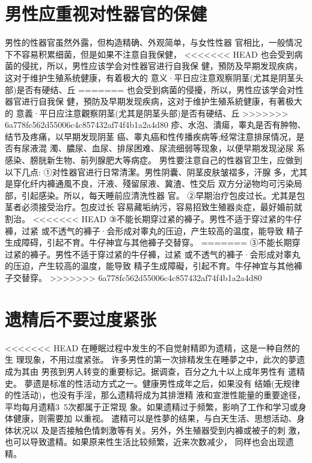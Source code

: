 \documentclass[12pt,UTF8]{ctexbook}
\begin{document}
\section{男性应重视对性器官的保健}

男性的性器官虽然外露，但构造精确、外观简单，与女性性器
官相比，一般情况下不容易积累细菌，但是如果不注意自我保健，
<<<<<<< HEAD
也会受到病菌的侵扰，所以，男性应该学会对性器官进行自我保
健，預防及早期发现疾病，这对于维护生殖系统健康，有着极大的
意义·平日应注意观察阴茎(尤其是阴茎头部)是否有硬结、丘
=======
也会受到病菌的侵擾，所以，男性应该学会对性器官进行自我保
健，預防及早期发现疾病，这对于维护生殖系統健康，有著极大的
意義·平日应注意觀察阴茎(尤其是阴茎头部)是否有硬结、丘
>>>>>>> 6a778fc562d55006c4c857432af74f4b1a2a4d80
疹、水泡、潰瘍，睾丸是否有肿物、结节及疼痛，以早期发现阴茎
癌、睾丸癌和性传播疾病等;经常注意排尿情况，是否有尿液混
濁、膿尿、血尿、排尿困难、尿流细弱等现象，以便早期发现泌尿
系感染、膀胱新生物、前列腺肥大等病症。
男性要注意自己的性器官卫生，应做到以下几点:
①对性器官进行日常清潔。男性阴囊、阴茎皮肤皱褶多，汗腺
多，尤其是穿化纤内褲通風不良，汗液、殘留尿液、冀渣、性交后
双方分泌物均可污染局部，引起感染。所以，每天睡前应清洗性器
官。
②早期治疗包皮过长。尤其是包茎者必须接受治疗。包皮过长
容易藏垢纳污，容易招致生殖器炎症，最好婚前就割治。
<<<<<<< HEAD
③不能长期穿过紧的褲子。男性不适于穿过紧的牛仔褲，过紧
或不透气的褲子·会形成对睾丸的压迫，产生较高的温度，能导致
精子生成障碍，引起不育。牛仔神宜与其他褲子交替穿。
=======
③不能长期穿过紧的褲子。男性不适于穿过紧的牛仔褲，过紧
或不透气的褲子·会形成对睾丸的压迫，产生较高的温度，能导致
精子生成障礙，引起不育。牛仔神宜与其他褲子交替穿。
>>>>>>> 6a778fc562d55006c4c857432af74f4b1a2a4d80

\section{遗精后不要过度紧张}

<<<<<<< HEAD
在睡眠过程中发生的不自觉射精即为遗精，这是一种自然的生
理现象，不用过度紧张。
许多男性的第一次排精发生在睡夢之中，此次的夢遗成为其由
男孩到男人转变的重要标记。据调查，百分之九十以上成年男性有
遣精史。
夢遗是标准的性活动方式之一。健康男性成年之后，如果没有
结婚(无规律的性活动)，也没有手淫，那么遗精将成为其排泄精
液和宣泄性能量的重要途径，平均每月遗精3~5次都属于正常现
象。如果遗精过于频繁，影响了工作和学习或身体健康，则需要加
以重视。
遣精可以是性夢的结果，与白天生活、思想活动、身体状况以
及是否接触色情刺激等有关。另外，外生殖器受到内褲或被子的刺
激，也可以导致遣精。如果原来性生活比较频繁，近来次数减少，
同样也会出现遗精。
\end{document}
